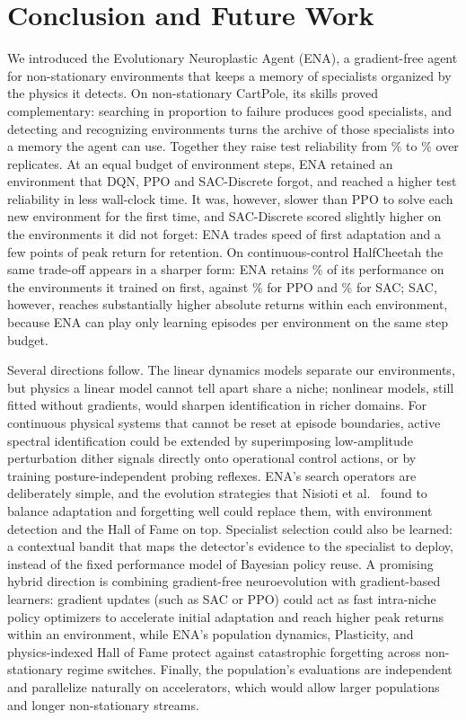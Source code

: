 \section{Conclusion and Future Work}
\label{sec:conclusion}

We introduced the Evolutionary Neuroplastic Agent (ENA), a gradient-free agent for non-stationary environments that keeps a memory of specialists organized by the physics it detects. On non-stationary CartPole, its skills proved complementary: searching in proportion to failure produces good specialists, and detecting and recognizing environments turns the archive of those specialists into a memory the agent can use. Together they raise test reliability from \% to \% over  replicates. At an equal budget of environment steps, ENA retained an environment that DQN, PPO and SAC-Discrete forgot, and reached a higher test reliability in less wall-clock time. It was, however, slower than PPO to solve each new environment for the first time, and SAC-Discrete scored slightly higher on the environments it did not forget: ENA trades speed of first adaptation and a few points of peak return for retention. On continuous-control HalfCheetah the same trade-off appears in a sharper form: ENA retains \% of its performance on the environments it trained on first, against \% for PPO and \% for SAC; SAC, however, reaches substantially higher absolute returns within each environment, because ENA can play only  learning episodes per environment on the same step budget.

Several directions follow. The linear dynamics models separate our environments, but physics a linear model cannot tell apart share a niche; nonlinear models, still fitted without gradients, would sharpen identification in richer domains. For continuous physical systems that cannot be reset at episode boundaries, active spectral identification could be extended by superimposing low-amplitude perturbation dither signals directly onto operational control actions, or by training posture-independent probing reflexes. ENA's search operators are deliberately simple, and the evolution strategies that Nisioti et al.~\cite{nisioti2026continual} found to balance adaptation and forgetting well could replace them, with environment detection and the Hall of Fame on top. Specialist selection could also be learned: a contextual bandit that maps the detector's evidence to the specialist to deploy, instead of the fixed performance model of Bayesian policy reuse. A promising hybrid direction is combining gradient-free neuroevolution with gradient-based learners: gradient updates (such as SAC or PPO) could act as fast intra-niche policy optimizers to accelerate initial adaptation and reach higher peak returns within an environment, while ENA's population dynamics, Plasticity, and physics-indexed Hall of Fame protect against catastrophic forgetting across non-stationary regime switches. Finally, the population's evaluations are independent and parallelize naturally on accelerators, which would allow larger populations and longer non-stationary streams.
